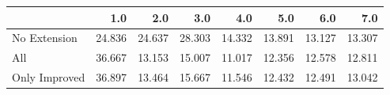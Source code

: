 \begin{tabular}{lrrrrrrr}
\toprule
{} &    1.0 &    2.0 &    3.0 &    4.0 &    5.0 &    6.0 &    7.0 \\
\midrule
No Extension  & 24.836 & 24.637 & 28.303 & 14.332 & 13.891 & 13.127 & 13.307 \\
All           & 36.667 & 13.153 & 15.007 & 11.017 & 12.356 & 12.578 & 12.811 \\
Only Improved & 36.897 & 13.464 & 15.667 & 11.546 & 12.432 & 12.491 & 13.042 \\
\bottomrule
\end{tabular}
